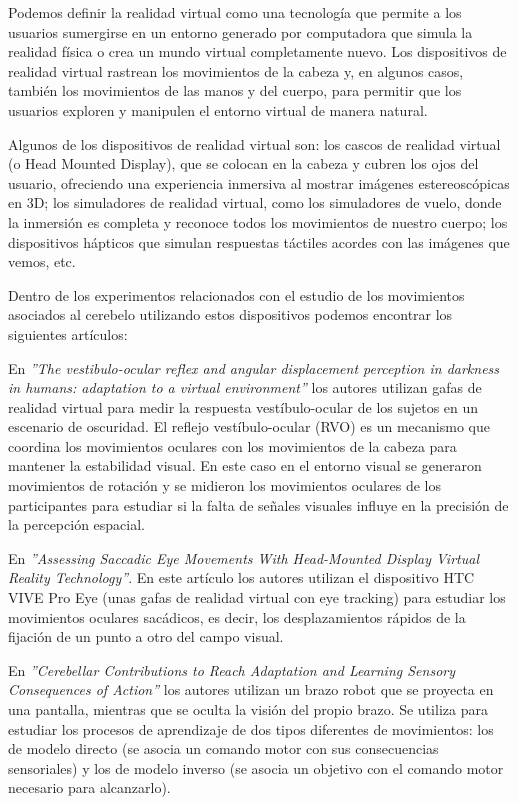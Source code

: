 \documentclass[a4paper,11pt, oneside]{book}
\begin{document}
Podemos definir la realidad virtual como una tecnología que permite a los usuarios sumergirse en un entorno generado por computadora que simula la realidad física o crea un mundo virtual completamente nuevo. Los dispositivos de realidad virtual rastrean los movimientos de la cabeza y, en algunos casos, también los movimientos de las manos y del cuerpo, para permitir que los usuarios exploren y manipulen el entorno virtual de manera natural. 

Algunos de los dispositivos de realidad virtual son: los cascos de realidad virtual (o Head Mounted Display), que se colocan en la cabeza y cubren los ojos del usuario, ofreciendo una experiencia inmersiva al mostrar imágenes estereoscópicas en 3D; los simuladores de realidad virtual, como los simuladores de vuelo, donde la inmersión es completa y reconoce todos los movimientos de nuestro cuerpo; los dispositivos hápticos que simulan respuestas táctiles acordes con las imágenes que vemos, etc.

Dentro de los experimentos relacionados con el estudio de los movimientos asociados al cerebelo utilizando estos dispositivos podemos encontrar los siguientes artículos:


En \textit{''The vestibulo-ocular reflex and angular displacement perception in darkness in humans: adaptation to a virtual environment''} los autores utilizan gafas de realidad virtual para medir la respuesta vestíbulo-ocular de los sujetos en un escenario de oscuridad. El reflejo vestíbulo-ocular (RVO) es un mecanismo que coordina los movimientos oculares con los movimientos de la cabeza para mantener la estabilidad visual. En este caso en el entorno visual se generaron movimientos de rotación y se midieron los movimientos oculares de los participantes para estudiar si la falta de señales visuales influye en la precisión de la percepción espacial.


En \textit{''Assessing Saccadic Eye Movements
	With Head-Mounted Display Virtual
	Reality Technology''}. En este artículo los autores utilizan el dispositivo HTC VIVE Pro Eye (unas gafas de realidad virtual con eye tracking) para estudiar los movimientos oculares sacádicos, es decir, los desplazamientos rápidos de la fijación de un punto a otro del campo visual. 
	

En \textit{''Cerebellar Contributions to Reach Adaptation and Learning Sensory Consequences of Action''} los autores utilizan un brazo robot que se proyecta en una pantalla, mientras que se oculta la visión del propio brazo. Se utiliza para estudiar los procesos de aprendizaje de dos tipos diferentes de movimientos: los de modelo directo (se asocia un comando motor con sus consecuencias sensoriales) y los de modelo inverso (se asocia un objetivo con el comando motor necesario para alcanzarlo).
\end{document}
